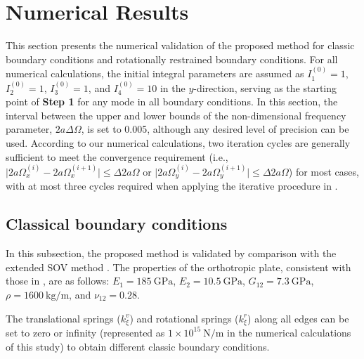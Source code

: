 \documentclass[preprint,12pt]{elsarticle}
\newcommand{\urho}{~\unit{\kilogram\per\meter}\xspace}
\newcommand{\ustif}{~\unit{\newton\per\metre}\xspace}
\newcommand{\nugpa}{~\si{\giga\pascal}\xspace}
\begin{document}
\FloatBarrier
\section{Numerical Results}  
This section presents the numerical validation of the proposed method for classic boundary conditions and rotationally restrained boundary conditions.  
For all numerical calculations, the initial integral parameters are assumed as $I^{(0)}_1=1$, $I^{(0)}_2=1$, $I^{(0)}_3=1$, and $I^{(0)}_4=10$ in the $y$-direction, serving as the starting point of \textbf{Step 1} for any mode in all boundary conditions.  
In this section, the interval between the upper and lower bounds of the non-dimensional frequency parameter, $2a\Delta\Omega$, is set to 0.005, although any desired level of precision can be used.
According to our numerical calculations, two iteration cycles are generally sufficient to meet the convergence requirement (i.e., $\lvert 2a\Omega^{(i)}_{x} - 2a\Omega^{(i+1)}_{x} \rvert \leq \Delta 2a\Omega$ or $\lvert 2a\Omega^{(i)}_{y} - 2a\Omega^{(i+1)}_{y} \rvert \leq \Delta 2a\Omega$) for most cases, with at most three cycles required when applying the iterative procedure in .
 
 

\subsection{Classical boundary conditions}
In this subsection, the proposed method is validated by comparison with the extended SOV method \cite{xing2020extended}.  
The properties of the orthotropic plate, consistent with those in \cite{xing2020extended}, are as follows:  
$E_1 = 185 \nugpa$, $E_2 = 10.5 \nugpa$, $G_{12} = 7.3 \nugpa$, $\rho = 1600 \urho$, and $\nu_{12} = 0.28$.
  
The translational springs ($k^v_\xi$) and rotational springs ($k^r_\xi$) along all edges can be set to zero or infinity (represented as $1 \times 10^{15} \ustif$ in the numerical calculations of this study) to obtain different classic boundary conditions.  
\end{document}

